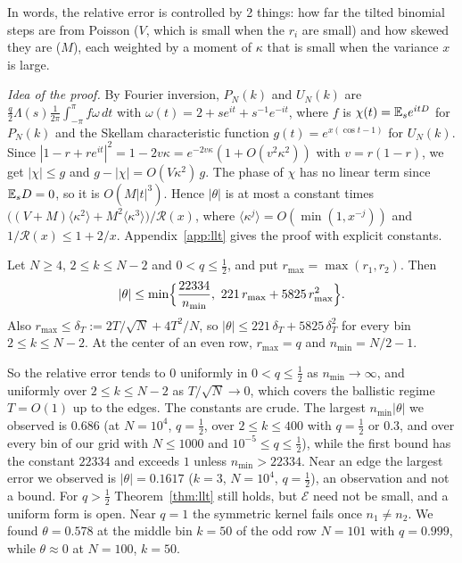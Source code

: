 In words, the relative error is controlled by 2 things: how far the tilted
binomial steps are from Poisson ($V$, which is small when the $r_i$ are small)
and how skewed they are ($M$), each weighted by a moment of $\kappa$ that is
small when the variance $x$ is large.

\emph{Idea of the proof.} By Fourier inversion, $P_N(k)$ and $U_N(k)$ are
$\frac q2\Lambda(s)\frac1{2\pi}\int_{-\pi}^{\pi}f\omega\,dt$ with
$\omega(t)=2+se^{it}+s^{-1}e^{-it}$, where $f$ is $\chi(t)=\mathbb{E}_se^{itD}$ for
$P_N(k)$ and the Skellam characteristic function $g(t)=e^{x(\cos t-1)}$ for
$U_N(k)$. Since $|1-r+re^{it}|^2=1-2v\kappa=e^{-2v\kappa}(1+O(v^2\kappa^2))$
with $v=r(1-r)$, we get $|\chi|\le g$ and $g-|\chi|=O(V\kappa^2)\,g$. The phase
of $\chi$ has no linear term since $\mathbb{E}_sD=0$, so it is $O(M|t|^3)$. Hence
$|\theta|$ is at most a constant times
$\bigl((V+M)\langle\kappa^2\rangle+M^2\langle\kappa^3\rangle\bigr)/\mathcal R(x)$,
where $\langle\kappa^j\rangle=O(\min(1,x^{-j}))$ and
$1/\mathcal R(x)\le1+2/x$. Appendix~\ref{app:llt} gives the proof with
explicit constants.

\begin{corollary}\label{cor:llt}
Let $N\ge4$, $2\le k\le N-2$ and $0<q\le\frac12$, and put
$r_{\max}=\max(r_1,r_2)$. Then
\[
|\theta|\le\min\Bigl\{\frac{22334}{n_{\min}},\ 221\,r_{\max}+5825\,r_{\max}^2\Bigr\}.
\]
Also $r_{\max}\le\delta_T:=2T/\sqrt N+4T^2/N$, so
$|\theta|\le221\,\delta_T+5825\,\delta_T^2$ for every bin $2\le k\le N-2$. At
the center of an even row, $r_{\max}=q$ and $n_{\min}=N/2-1$.
\end{corollary}

So the relative error tends to $0$ uniformly in $0<q\le\frac12$ as
$n_{\min}\to\infty$, and uniformly over $2\le k\le N-2$ as $T/\sqrt N\to0$,
which covers the ballistic regime $T=O(1)$ up to the edges. The constants are
crude. The largest $n_{\min}|\theta|$ we observed is $0.686$ (at $N=10^4$,
$q=\frac12$, over $2\le k\le400$ with $q=\frac12$ or $0.3$, and over every bin
of our grid with $N\le1000$ and $10^{-5}\le q\le\frac12$), while the first
bound has the constant $22334$ and exceeds $1$ unless $n_{\min}>22334$. Near an edge the largest error we
observed is $|\theta|=0.1617$ ($k=3$, $N=10^4$, $q=\frac12$), an observation
and not a bound. For $q>\frac12$ Theorem~\ref{thm:llt} still holds, but
$\mathcal E$ need not be small, and a uniform form is open. Near $q=1$ the
symmetric kernel fails once $n_1\ne n_2$. We found $\theta=0.578$ at the
middle bin $k=50$ of the odd row $N=101$ with $q=0.999$, while $\theta\approx0$
at $N=100$, $k=50$.

